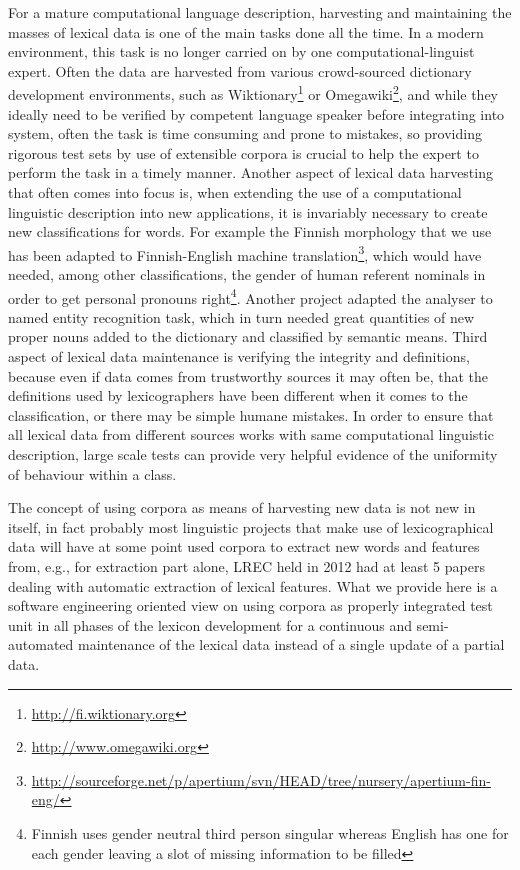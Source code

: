 \documentclass[a5paper]{article}
\begin{document}
For a mature computational language description, harvesting and maintaining the
masses of lexical data is one of the main tasks done all the time. In a modern
environment, this task is no longer carried on by one computational-linguist
expert. Often the data are harvested from various crowd-sourced dictionary
development environments, such as
Wiktionary\footnote{\url{http://fi.wiktionary.org}} or
O\-mega\-wi\-ki\footnote{\url{http://www.omegawiki.org}}, and while they
ideally need to be verified by competent language speaker before integrating
into system, often the task is time consuming and prone to mistakes, so
providing rigorous test sets by use of extensible corpora is crucial to help
the expert to perform the task in a timely manner. Another aspect of lexical
data harvesting that often comes into focus is, when extending the use of a
computational linguistic description into new applications, it is invariably
necessary to create new classifications for words. For example the Finnish
morphology that we use has been adapted to Finnish-English machine
translation\footnote{\url{http://sourceforge.net/p/apertium/svn/HEAD/tree/nursery/apertium-fin-eng/}},
which would have needed, among other classifications, the gender of human
referent nominals in order to get personal pronouns right\footnote{Finnish uses
gender neutral third person singular whereas English has one for each gender
leaving a slot of missing information to be filled}. Another project adapted
the analyser to named entity recognition task, which in turn needed great
quantities of new proper nouns added to the dictionary and classified by
semantic means. Third aspect of lexical data maintenance is verifying the
integrity and definitions, because even if data comes from trustworthy sources
it may often be, that the definitions used by lexicographers have been
different when it comes to the classification, or there may be simple humane
mistakes. In order to ensure that all lexical data from different sources works
with same computational linguistic description, large scale tests can provide
very helpful evidence of the uniformity of behaviour within a class.

The concept of using corpora as means of harvesting new data is not new in
itself, in fact probably most linguistic projects that make use of
lexicographical data will have at some point used corpora to extract new words
and features from, e.g., for extraction part alone, LREC held in 2012 had at
least 5 papers dealing with automatic extraction of lexical features.  What we
provide here is a software engineering oriented view on using corpora as
properly integrated test unit in all phases of the lexicon development for a
continuous and semi-automated maintenance of the lexical data instead of a
single update of a partial data.
\end{document}
